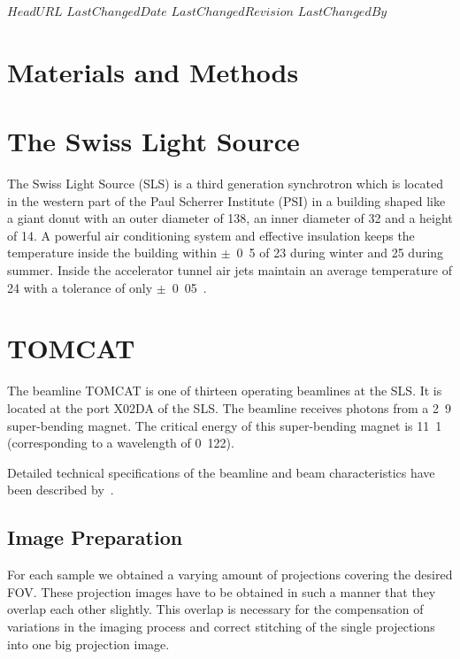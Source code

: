\svnidlong
{$HeadURL$}
{$LastChangedDate$}
{$LastChangedRevision$}
{$LastChangedBy$}
\section{Materials and Methods}
\section{The Swiss Light Source}
The Swiss Light Source (SLS) is a third generation synchrotron which is located in the western part of the Paul Scherrer Institute (PSI) in a building shaped like a giant donut with an outer diameter of \unit{138}{\meter}, an inner diameter of \unit{32}{\meter} and a height of \unit{14}{\meter}. A powerful air conditioning system and effective insulation keeps the temperature inside the building within $\pm$~\unit{0.5}{\celsius} of \unit{23}{\celsius} during winter and \unit{25}{\celsius} during summer. Inside the accelerator tunnel air jets maintain an average temperature of \unit{24}{\celsius} with a tolerance of only $\pm$~\unit{0.05}{\celsius}~\cite{wwwsls}.

\section{TOMCAT}
\label{sec:tomcat}
The beamline TOMCAT is one of thirteen operating beamlines at the SLS. It is located at the port X02DA of the SLS. The beamline receives photons from a \unit{2.9}{\tesla} super-bending magnet. The critical energy of this super-bending magnet is \unit{11.1}{\kilo\electronvolt} (corresponding to a wavelength of \unit{0.122}{\nano\meter}).

Detailed technical specifications of the beamline and beam characteristics have been described by~\citet{Stampanoni2006a,Stampanoni2007}.

\subsection{Image Preparation}
For each sample we obtained a varying amount of projections covering the desired FOV. These projection images have to be obtained in such a manner that they overlap each other slightly. This overlap is necessary for the compensation of variations in the imaging process and correct stitching of the single projections into one big projection image. 

